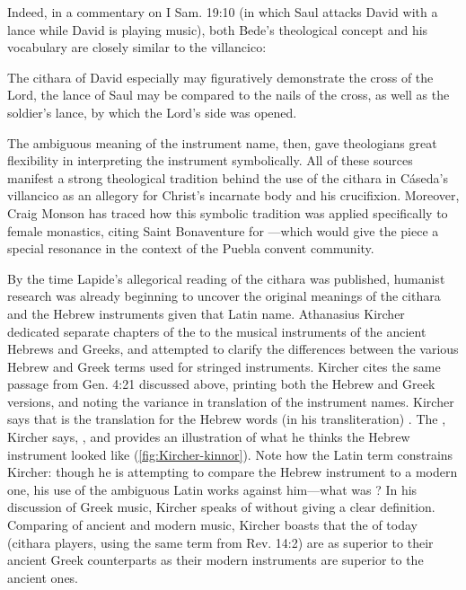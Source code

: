 Indeed, in a commentary on I Sam. 19:10 (in which Saul attacks David with a
lance while David is playing music), both Bede's theological concept and his
vocabulary are closely similar to the villancico: 
\begin{quoting} 
    The cithara  of David especially may figuratively
    demonstrate the cross of the Lord, the lance  of Saul may
    be compared to the nails  of the cross, as well as the
    soldier's lance, by which the Lord's side was opened.%
        \Autocite[123]{Bede:Commentaries2}
\end{quoting}

The ambiguous meaning of the instrument name, then, gave theologians great
flexibility in interpreting the instrument symbolically.
All of these sources manifest a strong theological tradition behind the use of
the cithara in Cáseda's villancico as an allegory for Christ's incarnate body
and his crucifixion.  
Moreover, Craig Monson has traced how this symbolic tradition was applied
specifically to female monastics, citing Saint Bonaventure for ---which would give the piece a special resonance in the
context of the Puebla convent community.%
    \Autocite[93--94]{Monson:DivasConvent}

By the time Lapide's allegorical reading of the cithara was published, humanist
research was already beginning to uncover the original meanings of the cithara
and the Hebrew instruments given that Latin name.
Athanasius Kircher dedicated separate chapters of the  to the
musical instruments of the ancient Hebrews and Greeks, and attempted to clarify
the differences between the various Hebrew and Greek terms used for stringed
instruments.
Kircher cites the same passage from Gen. 4:21 discussed above, printing both
the Hebrew and Greek versions, and noting the variance in translation of the
instrument names.
Kircher says that  is the translation for the Hebrew words (in
his transliteration) .
The , Kircher says, , and provides an illustration of what he thinks
the Hebrew instrument looked like (\cref{fig:Kircher-kinnor}).%
    \autocite[]{Kircher:Musurgia} 
Note how the Latin term constrains Kircher: though he is attempting to compare
the Hebrew instrument to a modern one, his use of the ambiguous Latin
 works against him---what was ?
In his discussion of Greek music, Kircher speaks of  without
giving a clear definition.
Comparing of ancient and modern music, Kircher boasts that the
 of today (cithara players, using the same term from Rev.
14:2) are as superior to their ancient Greek counterparts as their modern
instruments are superior to the ancient ones.
    \Autocite[]{Kircher:Musurgia}


